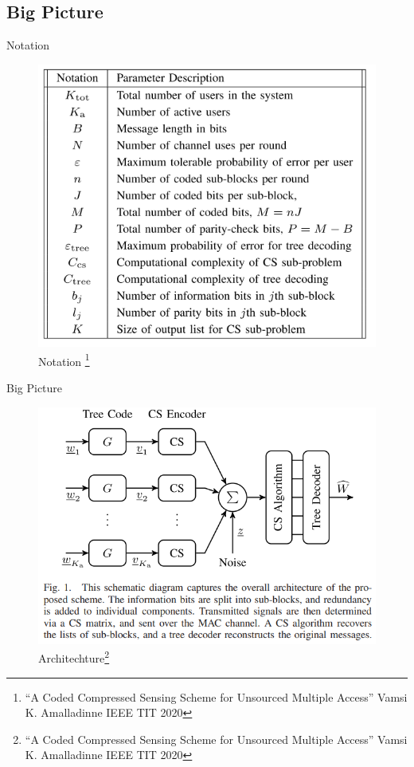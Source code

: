 \documentclass[aspectratio=169, handout, 10pt, hyperref=colorlinks]{beamer}
\begin{document}
\subsection{Big Picture}
\begin{frame}{Notation} 
 
    \begin{figure}
        \centering
        \includegraphics[width=0.45\linewidth]{images_CCS/notation.png}
        \caption{Notation
        \footnote{``A Coded Compressed Sensing Scheme for
Unsourced Multiple Access'' Vamsi K. Amalladinne IEEE TIT 2020}
}
        \label{fig:dataset}
    \end{figure}
\vspace{-1em}
 
\end{frame}


\begin{frame}{Big Picture} 
 
    \begin{figure}
        \centering
        \includegraphics[width=0.6\linewidth]{images_CCS/fig1.png}
        \caption{Architechture\footnote{``A Coded Compressed Sensing Scheme for
Unsourced Multiple Access'' Vamsi K. Amalladinne IEEE TIT 2020}}
        \label{fig:dataset}
    \end{figure}
    
\vspace{-1em}
 
\end{frame}
\end{document}
